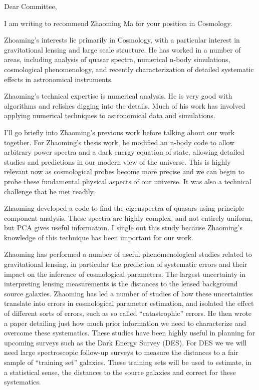 \documentclass[12pt]{letter}
\begin{document}
\begin{letter}{}

\opening{Dear Committee,}

I am writing to recommend Zhaoming Ma for your position in Cosmology.

Zhoaming's interests lie primarily in Cosmology, with a particular interest in
gravitational lensing and large scale structure.  He has worked in a number of
areas, including analysis of quasar spectra, numerical n-body simulations,
cosmological phenomenology, and recently characterization of detailed
systematic effects in astronomical instruments.

Zhaoming's technical expertise is numerical analysis. He is very good with
algorithms and relishes digging into the details.  Much of his work has
involved applying numerical techniques to astronomical data and simulations.

I'll go briefly into Zhaoming's previous work before talking about our work
together. For Zhaoming's thesis work, he modified an n-body code to allow
arbitrary power spectra and a dark energy equation of state, allowing detailed
studies and predictions in our modern view of the universe. This is highly
relevant now as cosmological probes become more precise and we can begin to
probe these fundamental physical aspects of our universe.  It was also a
technical challenge that he met readily. 

Zhaoming developed a code to find the eigenspectra of quasars using principle
component analysis.  These spectra are highly complex, and not entirely
uniform, but PCA gives useful information.  I single out this study because
Zhaoming's knowledge of this technique has been important for our work.

Zhaoming has performed a number of useful phenomenological studies related to
gravitational lensing, in particular the prediction of systematic errors and
their impact on the inference of cosmological parameters.  The largest
uncertainty in interpreting lensing measurements is the distances to the lensed
background source galaxies.  Zhaoming has led a number of studies of how these
uncertainties translate into errors in cosmological parameter estimation, and
isolated the effect of different sorts of errors, such as so called
``catastrophic'' errors.  He then wrote a paper detailing just how much prior
information we need to characterize and overcome these systematics.  These
studies have been highly useful in planning for upcoming surveys such as the
Dark Energy Survey (DES). For DES we we will need large spectroscopic follow-up
surveys to measure the distances to a fair sample of ``training set'' galaxies.
These training sets will be used to estimate, in a statistical sense, the
distances to the source galaxies and correct for these systematics.


\end{letter}
\end{document}
